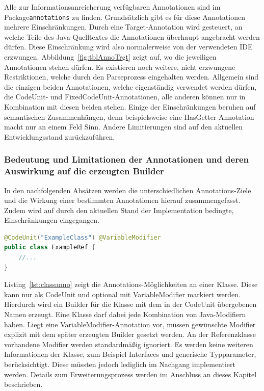 \documentclass[12pt,oneside,a4paper,parskip]{scrbook}
\begin{document}
Alle zur Informationsanreicherung verfügbaren Annotationen sind im Package\linebreak \texttt{annotations} zu finden. Grundsätzlich gibt es für diese Annotationen mehrere Einschränkungen. Durch eine Target-Annotation wird gesteuert, an welche Teile des Java-Quelltextes die Annotationen überhaupt angebracht werden dürfen. Diese Einschränkung wird also normalerweise von der verwendeten IDE erzwungen. Abbildung~\ref{fig:tblAnnoTrgt} zeigt auf, wo die jeweiligen Annotationen stehen dürfen. Es existieren noch weitere, nicht erzwungene Restriktionen, welche durch den Parseprozess eingehalten werden. Allgemein sind die einzigen beiden Annotationen, welche eigenständig verwendet werden dürfen, die CodeUnit- und FixedCodeUnit-Annotationen, alle anderen können nur in Kombination mit diesen beiden stehen. Einige der Einschränkungen beruhen auf semantischen Zusammenhängen, denn beispielsweise eine HasGetter-Annotation macht nur an einem Feld Sinn. Andere Limitierungen sind auf den aktuellen Entwicklungsstand zurückzuführen.

\subsubsection{Bedeutung und Limitationen der Annotationen und deren Auswirkung auf die erzeugten Builder}

In den nachfolgenden Absätzen werden die unterschiedlichen Annotations-Ziele und die Wirkung einer bestimmten Annotationen hierauf zusammengefasst. Zudem wird auf durch den aktuellen Stand der Implementation bedingte, Einschränkungen eingegangen.

\begin{lstlisting}[label=lst:classanno,
language=java,
firstnumber=1,
caption=Darstellung der Annotations-Möglichkeiten an einer Klasse.]
@CodeUnit("ExampleClass") @VariableModifier
public class ExampleRef {
	//...
}
\end{lstlisting}

Listing~\ref{lst:classanno} zeigt die Annotations-Möglichkeiten an einer Klasse. Diese kann nur als CodeUnit und optional mit VariableModifier markiert werden. Hierdurch wird ein Builder für die Klasse mit dem in der CodeUnit übergebenen Namen erzeugt. Eine Klasse darf dabei jede Kombination von Java-Modifiern haben. Liegt eine VariableModifier-Annotation vor, müssen gewünschte Modifier explizit mit dem später erzeugten Builder gesetzt werden. An der Referenzklasse vorhandene Modifier werden standardmäßig ignoriert. Es werden keine weiteren Informationen der Klasse, zum Beispiel Interfaces und generische Typparameter, berücksichtigt. Diese müssten jedoch lediglich im Nachgang implementiert werden. Details zum Erweiterungsprozess werden im Anschluss an dieses Kapitel beschrieben.
\end{document}
